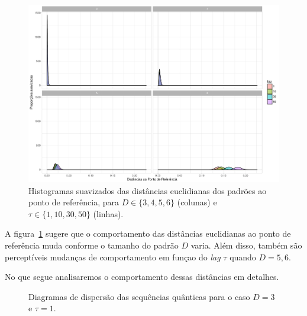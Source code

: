 \begin{figure}[hbt]
\centering
\includegraphics[width=\linewidth]{../Plots/HistoDistanciasQuantTodas}
\caption{Histogramas suavizados das distâncias euclidianas dos padrões ao ponto de referência, para $D\in\{3,4,5,6\}$ (colunas) e $\tau\in\{1,10,30,50\}$ (linhas).}\label{Fig:HistoDistanciasQuantTodas}
\end{figure}

A figura~\ref{Fig:HistoDistanciasQuantTodas} sugere que o comportamento das distâncias euclidianas ao ponto de referência muda conforme o tamanho do padrão $D$ varia.
Além disso, também são perceptíveis mudanças de comportamento em funçao do \textit{lag} $\tau$ quando $D=5,6$.

No que segue analisaremos o comportamento dessas distâncias em detalhes.


\begin{figure}
\centering
{}
\caption{Diagramas de dispersão das sequências quânticas para o caso $D=3$ e $\tau=1$.}\label{Fig:QuantD3tau1}
\end{figure}

